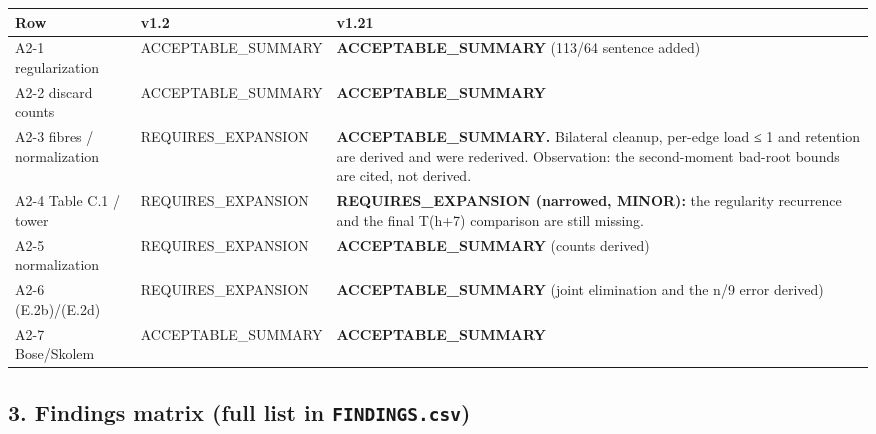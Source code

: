 \documentclass[
]{article}
\newcounter{none} %
\begin{document}
{\def\LTcaptype{none} %
\begin{longtable}[]{@{}lll@{}}
\toprule\noalign{}
Row & v1.2 & v1.21 \\
\midrule\noalign{}
\endhead
\bottomrule\noalign{}
\endlastfoot
A2-1 regularization & ACCEPTABLE\_SUMMARY & \textbf{ACCEPTABLE\_SUMMARY}
(113/64 sentence added) \\
A2-2 discard counts & ACCEPTABLE\_SUMMARY &
\textbf{ACCEPTABLE\_SUMMARY} \\
A2-3 fibres / normalization & REQUIRES\_EXPANSION &
\textbf{ACCEPTABLE\_SUMMARY.} Bilateral cleanup, per-edge load ≤ 1 and
retention are derived and were rederived. Observation: the second-moment
bad-root bounds are cited, not derived. \\
A2-4 Table C.1 / tower & REQUIRES\_EXPANSION &
\textbf{REQUIRES\_EXPANSION (narrowed, MINOR):} the regularity
recurrence and the final T(h+7) comparison are still missing. \\
A2-5 normalization & REQUIRES\_EXPANSION & \textbf{ACCEPTABLE\_SUMMARY}
(counts derived) \\
A2-6 (E.2b)/(E.2d) & REQUIRES\_EXPANSION & \textbf{ACCEPTABLE\_SUMMARY}
(joint elimination and the n/9 error derived) \\
A2-7 Bose/Skolem & ACCEPTABLE\_SUMMARY & \textbf{ACCEPTABLE\_SUMMARY} \\
\end{longtable}
}

\subsection{\texorpdfstring{3. Findings matrix (full list in
\texttt{FINDINGS.csv})}{3. Findings matrix (full list in FINDINGS.csv)}}\label{3-findings-matrix-full-list-in-findingscsv}
\end{document}
